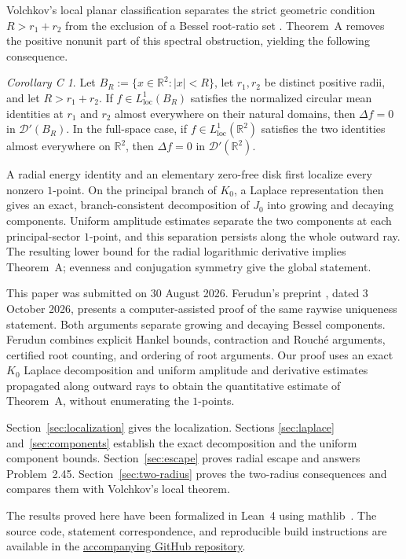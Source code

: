 \documentclass[11pt]{amsart}
\numberwithin{equation}{section}
\theoremstyle{definition}
\theoremstyle{remark}
\newtheorem*{corollaryC}{Corollary C}
\newcommand{\R}{\mathbb R}
\newcommand{\D}{\mathcal D}
\begin{document}
Volchkov's local planar classification separates the strict geometric
condition $R>r_1+r_2$ from the exclusion of a Bessel root-ratio set
\cite{Volchkov1996}.  Theorem~A removes the positive nonunit part of this
spectral obstruction, yielding the following consequence.

\begin{corollaryC}
Let $B_R:=\{x\in\R^2:|x|<R\}$, let $r_1,r_2$ be distinct positive radii,
and let $R>r_1+r_2$.  If $f\in L^1_{\mathrm{loc}}(B_R)$ satisfies the
normalized circular mean identities at $r_1$ and $r_2$ almost everywhere
on their natural domains, then $\Delta f=0$ in $\D'(B_R)$.  In the
full-space case, if $f\in L^1_{\mathrm{loc}}(\R^2)$ satisfies the two
identities almost everywhere on $\R^2$, then $\Delta f=0$ in $\D'(\R^2)$.
\end{corollaryC}

A radial energy identity and an elementary zero-free disk first localize
every nonzero $1$-point.  On the
principal branch of $K_0$, a Laplace representation then gives an exact,
branch-consistent decomposition of $J_0$ into growing and decaying
components.  Uniform amplitude estimates separate the two components at
each principal-sector $1$-point, and this separation persists along the
whole outward ray.  The resulting lower bound for the radial logarithmic
derivative implies Theorem~A; evenness and conjugation symmetry give
the global statement.

This paper was submitted on 30 August 2026.  Ferudun's preprint
\cite{Ferudun2026}, dated 3 October 2026, presents a computer-assisted proof
of the same raywise uniqueness statement.  Both arguments separate growing
and decaying Bessel components.  Ferudun combines explicit Hankel bounds,
contraction and Rouch\'e arguments, certified root counting, and ordering
of root arguments.  Our proof uses an exact $K_0$ Laplace decomposition and
uniform amplitude and derivative estimates propagated along outward rays
to obtain the quantitative estimate of Theorem~A, without enumerating the
$1$-points.

Section~\ref{sec:localization} gives the localization.  Sections
\ref{sec:laplace} and~\ref{sec:components} establish the exact decomposition
and the uniform component bounds.  Section~\ref{sec:escape} proves radial
escape and answers Problem~2.45.  Section~\ref{sec:two-radius} proves the
two-radius consequences and compares them with Volchkov's local theorem.

The results proved here have been formalized in Lean~4 using
mathlib~\cite{Lean4,mathlib}. The source code, statement correspondence,
and reproducible build instructions are available in the
\href{https://github.com/VerMoriarty/j0-radial-uniqueness}
{accompanying GitHub repository}.
\end{document}

